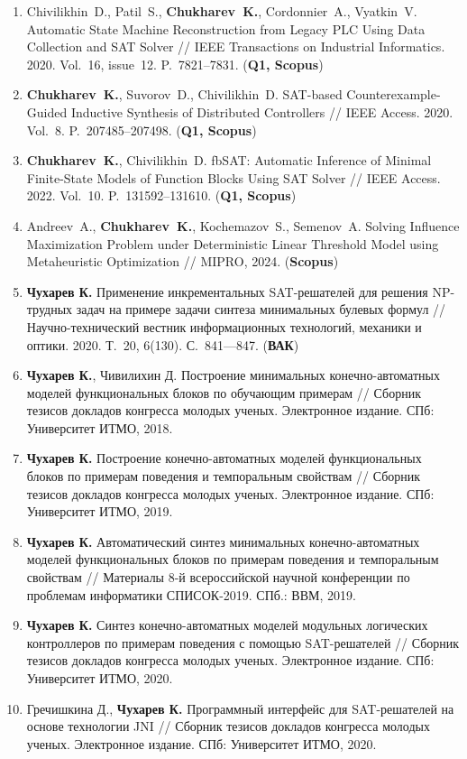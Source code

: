 \begin{enumerate}[left=0pt]
    \item Chivilikhin~D., Patil~S., \textbf{Chukharev~K.}, Cordonnier~A., Vyatkin~V. Automatic State Machine Reconstruction from Legacy PLC Using Data Collection and SAT Solver // IEEE Transactions on Industrial Informatics. 2020. Vol.~16, issue~12. P.~7821–7831. (\textbf{Q1, Scopus})
    \item \textbf{Chukharev~K.}, Suvorov~D., Chivilikhin~D. SAT-based Counterexample-Guided Inductive Synthesis of Distributed Controllers // IEEE Access. 2020. Vol.~8. P.~207485–207498. (\textbf{Q1, Scopus})
    \item \textbf{Chukharev~K.}, Chivilikhin~D. fbSAT: Automatic Inference of Minimal Finite-State Models of Function Blocks Using SAT Solver // IEEE Access. 2022. Vol.~10. P.~131592–131610. (\textbf{Q1, Scopus})
    \item Andreev~A., \textbf{Chukharev~K.}, Kochemazov~S., Semenov~A. Solving Influence Maximization Problem under Deterministic Linear Threshold Model using Metaheuristic Optimization // MIPRO, 2024. (\textbf{Scopus})
    \item \textbf{Чухарев К.} Применение инкрементальных SAT-решателей для решения NP-трудных задач на примере задачи синтеза минимальных булевых формул // Научно-технический вестник информационных технологий, механики и оптики. 2020. Т.~20, 6(130). С.~841—847. (\textbf{ВАК})
    \item \textbf{Чухарев К.}, Чивилихин Д. Построение минимальных конечно-автоматных моделей функциональных блоков по обучающим примерам // Сборник тезисов докладов конгресса молодых ученых. Электронное издание. СПб: Университет ИТМО, 2018.
    \item \textbf{Чухарев К.} Построение конечно-автоматных моделей функциональных блоков по примерам поведения и темпоральным свойствам // Сборник тезисов докладов конгресса молодых ученых. Электронное издание. СПб: Университет ИТМО, 2019.
    \item \textbf{Чухарев К.} Автоматический синтез минимальных конечно-автоматных моделей функциональных блоков по примерам поведения и темпоральным свойствам // Материалы 8-й всероссийской научной конференции по проблемам информатики СПИСОК-2019. СПб.: ВВМ, 2019.
    \item \textbf{Чухарев К.} Синтез конечно-автоматных моделей модульных логических контроллеров по примерам поведения с помощью SAT-решателей // Сборник тезисов докладов конгресса молодых ученых. Электронное издание. СПб: Университет ИТМО, 2020.
    \item Гречишкина Д., \textbf{Чухарев К.} Программный интерфейс для SAT-решателей на основе технологии JNI // Сборник тезисов докладов конгресса молодых ученых. Электронное издание. СПб: Университет ИТМО, 2020.
\end{enumerate}

